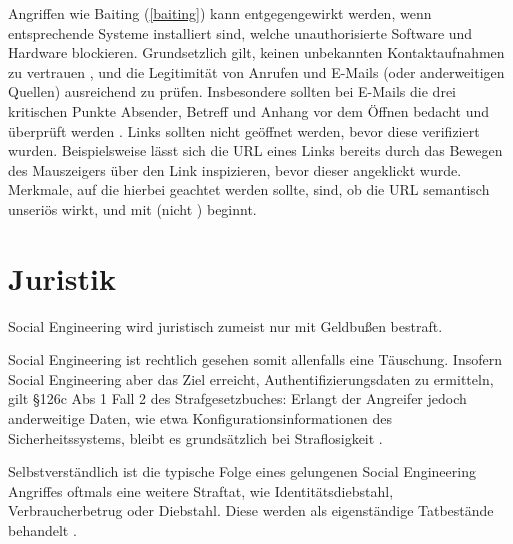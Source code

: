 Angriffen wie Baiting (\autoref{baiting}) kann entgegengewirkt werden, wenn entsprechende Systeme installiert sind, welche unauthorisierte Software und Hardware blockieren.
Grundsetzlich gilt, keinen unbekannten Kontaktaufnahmen zu vertrauen , und die Legitimität von Anrufen und E-Mails (oder anderweitigen Quellen) ausreichend zu prüfen.
Insbesondere sollten bei E-Mails die drei kritischen Punkte Absender, Betreff und Anhang vor dem Öffnen bedacht und überprüft werden .
Links sollten nicht geöffnet werden, bevor diese verifiziert wurden. Beispielsweise lässt sich die URL eines Links bereits durch das Bewegen des Mauszeigers über den Link inspizieren, bevor dieser angeklickt wurde.
Merkmale, auf die hierbei geachtet werden sollte, sind, ob die URL semantisch unseriös wirkt, und mit  (nicht ) beginnt. 

\section{Juristik}

Social Engineering wird juristisch zumeist nur mit Geldbußen bestraft.

Social Engineering ist rechtlich gesehen somit allenfalls eine Täuschung.
Insofern Social Engineering aber das Ziel erreicht, Authentifizierungsdaten zu ermitteln, gilt §126c Abs 1 Fall 2 des Strafgesetzbuches:
Erlangt der Angreifer jedoch anderweitige Daten, wie etwa Konfigurationsinformationen des Sicherheitssystems, bleibt es grundsätzlich bei Straflosigkeit .

Selbstverständlich ist die typische Folge eines gelungenen Social Engineering Angriffes oftmals eine weitere Straftat, wie Identitätsdiebstahl, Verbraucherbetrug oder Diebstahl.
Diese werden als eigenständige Tatbestände behandelt .
